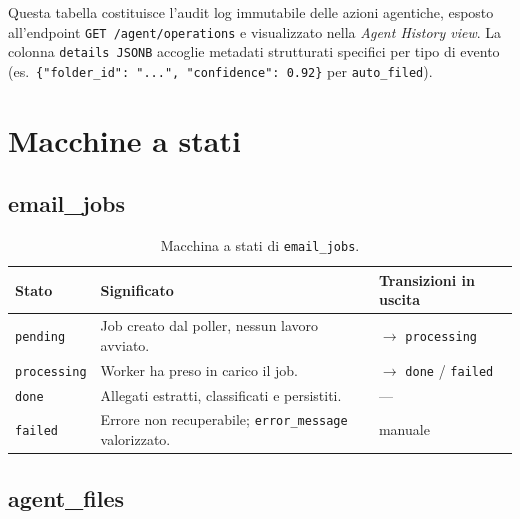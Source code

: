 Questa tabella costituisce l'audit log immutabile delle azioni agentiche, esposto
all'endpoint \texttt{GET /agent/operations} e visualizzato nella \emph{Agent History
view}. La colonna \texttt{details JSONB} accoglie metadati strutturati specifici per
tipo di evento (es.\ \texttt{\{"folder\_id": "...", "confidence": 0.92\}} per
\texttt{auto\_filed}).

\section{Macchine a stati}
\label{sec:state_machines}

\subsection{email\_jobs}

\begin{table}[ht]
\centering
\small
\begin{tabularx}{\linewidth}{l X l}
\toprule
\textbf{Stato} & \textbf{Significato} & \textbf{Transizioni in uscita} \\
\midrule
\texttt{pending}    & Job creato dal poller, nessun lavoro avviato.                  & $\rightarrow$ \texttt{processing} \\
\texttt{processing} & Worker ha preso in carico il job.                              & $\rightarrow$ \texttt{done} / \texttt{failed} \\
\texttt{done}       & Allegati estratti, classificati e persistiti.                  & --- \\
\texttt{failed}     & Errore non recuperabile; \texttt{error\_message} valorizzato.  & manuale \\
\bottomrule
\end{tabularx}
\caption{Macchina a stati di \texttt{email\_jobs}.}
\label{tab:state_machine_jobs}
\end{table}

\subsection{agent\_files}

